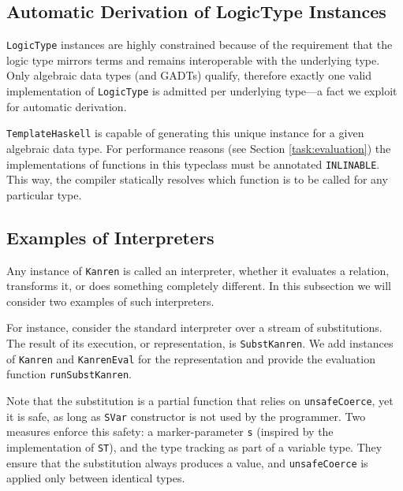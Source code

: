 
\subsection{Automatic Derivation of LogicType Instances}
\label{tagless:types}

\lstinline{LogicType} instances are highly constrained because of the requirement that the logic type mirrors \mk terms and remains interoperable with the underlying type. 
Only algebraic data types (and GADTs) qualify, therefore exactly one valid implementation of \lstinline{LogicType} is admitted per underlying type---a fact we exploit for automatic derivation. 

\lstinline{TemplateHaskell} is capable of generating this unique instance for a given algebraic data type. 
For performance reasons (see Section \ref{task:evaluation}) the implementations of functions in this typeclass must be annotated \lstinline{INLINABLE}. 
This way, the compiler statically resolves which function is to be called for any particular type.

\subsection{Examples of Interpreters}
\label{tagless:interpreters}

Any instance of \lstinline{Kanren} is called an interpreter, whether it evaluates a relation, transforms it, or does something completely different. 
In this subsection we will consider two examples of such interpreters. 

For instance, consider the standard \mk interpreter over a stream of substitutions. 
The result of its execution, or representation, is \lstinline{SubstKanren}. 
We add instances of \lstinline{Kanren} and \lstinline{KanrenEval} for the representation and provide the evaluation function \lstinline{runSubstKanren}. 

Note that the substitution is a partial function that relies on \lstinline{unsafeCoerce}, yet it is safe, as long as \lstinline{SVar} constructor is not used by the programmer. 
Two measures enforce this safety: a marker-parameter \lstinline{s} (inspired by the implementation of \lstinline{ST}), and the type tracking as part of a variable type. 
They ensure that the substitution always produces a value, and \lstinline{unsafeCoerce} is applied only between identical types.

